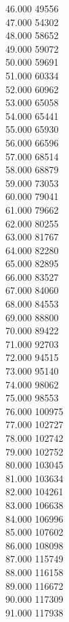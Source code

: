{ 46.000	49556 \\
 47.000	54302 \\
 48.000	58652 \\
 49.000	59072 \\
 50.000	59691 \\
 51.000	60334 \\
 52.000	60962 \\
 53.000	65058 \\
 54.000	65441 \\
 55.000	65930 \\
 56.000	66596 \\
 57.000	68514 \\
 58.000	68879 \\
 59.000	73053 \\
 60.000	79041 \\
 61.000	79662 \\
 62.000	80255 \\
 63.000	81767 \\
 64.000	82280 \\
 65.000	82895 \\
 66.000	83527 \\
 67.000	84060 \\
 68.000	84553 \\
 69.000	88800 \\
 70.000	89422 \\
 71.000	92703 \\
 72.000	94515 \\
 73.000	95140 \\
 74.000	98062 \\
 75.000	98553 \\
 76.000	100975 \\
 77.000	102727 \\
 78.000	102742 \\
 79.000	102752 \\
 80.000	103045 \\
 81.000	103634 \\
 82.000	104261 \\
 83.000	106638 \\
 84.000	106996 \\
 85.000	107602 \\
 86.000	108098 \\
 87.000	115749 \\
 88.000	116158 \\
 89.000	116672 \\
 90.000	117309 \\
 91.000	117938 \\
}
